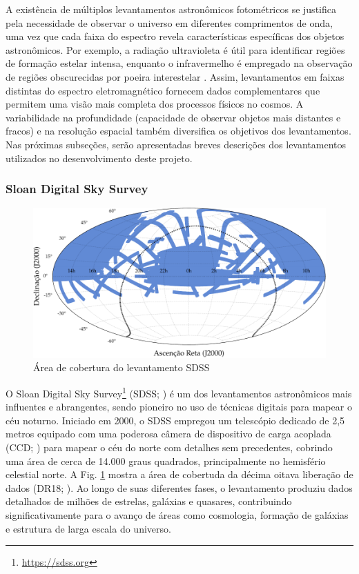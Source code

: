 A existência de múltiplos levantamentos astronômicos fotométricos se justifica pela necessidade de observar o universo em diferentes comprimentos de onda, uma vez que cada faixa do espectro revela características específicas dos objetos astronômicos. Por exemplo, a radiação ultravioleta é útil para identificar regiões de formação estelar intensa, enquanto o infravermelho é empregado na observação de regiões obscurecidas por poeira interestelar \cite[p. 28-31]{extragalactic-astronomy-book}. Assim, levantamentos em faixas distintas do espectro eletromagnético fornecem dados complementares que permitem uma visão mais completa dos processos físicos no cosmos. A variabilidade na profundidade (capacidade de observar objetos mais distantes e fracos) e na resolução espacial também diversifica os objetivos dos levantamentos. Nas próximas subseções, serão apresentadas breves descrições dos levantamentos utilizados no desenvolvimento deste projeto.


\subsubsection{Sloan Digital Sky Survey}
\label{sec:sdss}

\begin{figure}[!ht]
  \caption{Área de cobertura do levantamento SDSS}
  \label{fig:coverage-sdss}
  \includegraphics[width=\linewidth]{notebooks/plots/sdss_footprint.pdf}
\end{figure}

O Sloan Digital Sky Survey\footnote{\url{https://sdss.org}} (SDSS; \citealp{sdss}) é um dos levantamentos astronômicos mais influentes e abrangentes, sendo pioneiro no uso de técnicas digitais para mapear o céu noturno. Iniciado em 2000, o SDSS empregou um telescópio dedicado de 2,5 metros \cite{sdss-telescope} equipado com uma poderosa câmera de dispositivo de carga acoplada (CCD;  \citealp{sdss-camera}) para mapear o céu do norte com detalhes sem precedentes, cobrindo uma área de cerca de 14.000 graus quadrados, principalmente no hemisfério celestial norte. A Fig. \ref{fig:coverage-sdss} mostra a área de cobertuda da décima oitava liberação de dados (DR18; \citealp{sdss-dr18}). Ao longo de suas diferentes fases, o levantamento produziu dados detalhados de milhões de estrelas, galáxias e quasares, contribuindo significativamente para o avanço de áreas como cosmologia, formação de galáxias e estrutura de larga escala do universo.

